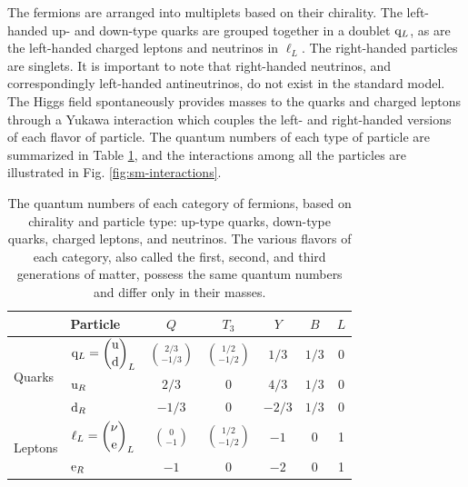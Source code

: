 The fermions are arranged into multiplets based on their chirality. The left-handed up- and down-type quarks are grouped together in a doublet $\mathrm{q}_L$, as are the left-handed charged leptons and neutrinos in $\ell_L$. The right-handed particles are singlets. It is important to note that right-handed neutrinos, and correspondingly left-handed antineutrinos, do not exist in the standard model. The Higgs field spontaneously provides masses to the quarks and charged leptons through a Yukawa interaction which couples the left- and right-handed versions of each flavor of particle. The quantum numbers of each type of particle are summarized in Table \ref{tab:q-num}, and the interactions among all the particles are illustrated in Fig. \ref{fig:sm-interactions}.

\begin{table}[htb]
  \begin{center}
    \def\arraystretch{2.0} %
    \begin{tabular}{|l||l|c|c|c|c|c|}
\hline
      & Particle & $Q$ & $T_3$ & $Y$ & $B$ & $L$ \\
\hline
\hline
\multirow{3}{*}{Quarks}  & $\mathrm{q}_L = \displaystyle\binom{\mathrm{u}}{\mathrm{d}}_L$ & $\displaystyle\binom{2/3}{-1/3}$ & $\displaystyle\binom{1/2}{-1/2}$ & $1/3$  & $1/3$ & 0 \\
                         & $\mathrm{u}_R$                                      & $2/3$                            & 0                                & $4/3$  & $1/3$ & 0 \\
                         & $\mathrm{d}_R$                                      & $-1/3$                           & 0                                & $-2/3$ & $1/3$ & 0 \\
\hline
\multirow{2}{*}{Leptons} & $\ell_L = \displaystyle\binom{\nu}{\mathrm{e}}_L$     & $\displaystyle\binom{0}{-1}$     & $\displaystyle\binom{1/2}{-1/2}$ & $-1$   & 0     & 1 \\
                         & $\mathrm{e}_R$                                        & $-1$                             & 0                                & $-2$   & 0     & 1 \\
\hline
    \end{tabular}
    \caption{The quantum numbers of each category of fermions, based on chirality and particle type: up-type quarks, down-type quarks, charged leptons, and neutrinos. The various flavors of each category, also called the first, second, and third generations of matter, possess the same quantum numbers and differ only in their masses.}
    \label{tab:q-num}
  \end{center}
\end{table}

